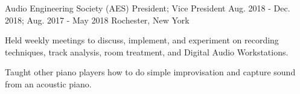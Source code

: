 


\begin{cventries}


\cventry
{Audio Engineering Society (AES)} %
{President; Vice President} %
{\hspace{-10mm}Aug. 2018 - Dec. 2018; Aug. 2017 - May 2018} %
{Rochester, New York} %
{ %
\vspace{0.5mm}
\begin{cvitems}
\item {Held weekly meetings to discuss, implement, and experiment on recording techniques, track analysis, room treatment, and Digital Audio Workstations.}
\item {Taught other piano players how to do simple improvisation and capture sound from an acoustic piano.}
\end{cvitems}
}






\end{cventries}
